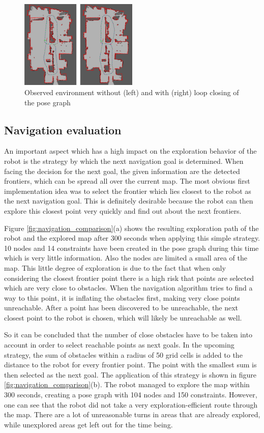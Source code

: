 \documentclass{ba-kecs}
\begin{document}
\begin{figure}[htbp]
	\centering
		\includegraphics[width=0.50\textwidth]{figures/Loop_closing_compared.jpg}
	\caption{Observed environment without (left) and with (right) loop closing of the pose graph}
	\label{fig:loop_closing_comparison}
\end{figure}

\subsection{Navigation evaluation}
An important aspect which has a high impact on the exploration behavior of the robot is the strategy by which the next navigation goal is determined. When facing the decision for the next goal, the given information are the detected frontiers, which can be spread all over the current map. The most obvious first implementation idea was to select the frontier which lies closest to the robot as the next navigation goal. This is definitely desirable because the robot can then explore this closest point very quickly and find out about the next frontiers.

Figure \ref{fig:navigation_comparison}(a) shows the resulting exploration path of the robot and the explored map after 300 seconds when applying this simple strategy. 10 nodes and 14 constraints have been created in the pose graph during this time which is very little information. Also the nodes are limited a small area of the map. This little degree of exploration is due to the fact that when only considering the closest frontier point there is a high risk that points are selected which are very close to obstacles. When the navigation algorithm tries to find a way to this point, it is inflating the obstacles first, making very close points unreachable. After a point has been discovered to be unreachable, the next closest point to the robot is chosen, which will likely be unreachable as well.

So it can be concluded that the number of close obstacles have to be taken into account in order to select reachable points as next goals. In the upcoming strategy, the sum of obstacles within a radius of 50 grid cells is added to the distance to the robot for every frontier point. The point with the smallest sum is then selected as the next goal. The application of this strategy is shown in figure \ref{fig:navigation_comparison}(b). The robot managed to explore the map within 300 seconds, creating a pose graph with 104 nodes and 150 constraints. However, one can see that the robot did not take a very exploration-efficient route through the map. There are a lot of unreasonable turns in areas that are already explored, while unexplored areas get left out for the time being.
\end{document}
